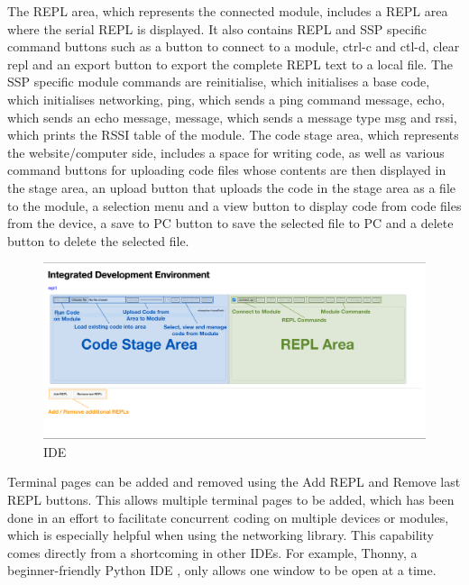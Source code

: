 The REPL area, which represents the connected module, includes a REPL area where the serial REPL is displayed. It also contains REPL and SSP specific command buttons such as a button to connect to a module, ctrl-c and ctl-d, clear repl and an export button to export the complete REPL text to a local file. The SSP specific module commands are reinitialise, which initialises a base code, which initialises networking, ping, which sends a ping command message, echo, which sends an echo message, message, which sends a message type msg and rssi, which prints the RSSI table of the module. 
The code stage area, which represents the website/computer side, includes a space for writing code, as well as various command buttons for uploading code files whose contents are then displayed in the stage area, an upload button that uploads the code in the stage area as a file to the module, a selection menu and a view button to display code from code files from the device, a save to PC button to save the selected file to PC and a delete button to delete the selected file.

\begin{figure}[H]
    \centering
    \includegraphics[width=\linewidth]{overleaf/images/ide.png}
    \vspace{\ftspace}
    \caption{IDE}
    \vspace{\ftspace}
    \label{fig:ide}
\end{figure}

Terminal pages can be added and removed using the Add REPL and Remove last REPL buttons. This allows multiple terminal pages to be added, which has been done in an effort to facilitate concurrent coding on multiple devices or modules, which is especially helpful when using the networking library. This capability comes directly from a shortcoming in other IDEs. For example, Thonny, a beginner-friendly Python IDE \citep{annamaa_thonny_2015, aivar_annamaa_thonny_2025,aivar_annamaa_thonny_nodate, annamaa_introducing_2015}, only allows one window to be open at a time.\\


